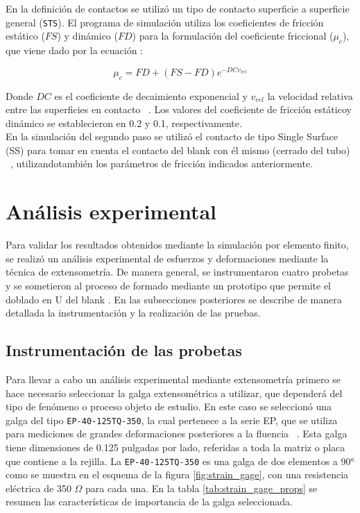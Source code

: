 En la definición de contactos se utilizó un tipo de contacto superficie a superficie
general (\texttt{STS}). El programa de simulación utiliza los coeficientes de fricción 
estático ($FS$) y dinámico ($FD$) para la formulación del coeficiente friccional ($\mu_c$),
que viene dado por la ecuación :

\begin{equation}
\mu_c = FD + (FS - FD) e^{-DCv_{rel}}
\label{eq:frictional_coeff}
\end{equation}

Donde $DC$ es el coeficiente de decaimiento exponencial y $v_{rel}$ la velocidad relativa
entre las superficies en contacto ~\cite{lsdyna-manual}. Los valores del coeficiente de 
fricción estáticoy dinámico se establecieron en 0.2 y 0.1, respectivamente. ~\cite{carvill1993} \\

En la simulación del segundo paso se utilizó el contacto de tipo Single Surface (SS) para 
tomar en cuenta el contacto del blank con él mismo (cerrado del tubo) ~\cite{lsdyna-manual}, 
utilizandotambién los parámetros de fricción indicados anteriormente.

\section{Análisis experimental}

Para validar los resultados obtenidos mediante la simulación por elemento finito, se realizó 
un análisis experimental de esfuerzos y deformaciones mediante la técnica de extensometría. 
De manera general, se instrumentaron cuatro probetas y se sometieron al proceso de formado 
mediante un prototipo que permite el doblado en U del blank . En las subsecciones posteriores se describe 
de manera detallada la instrumentación y la realización de las pruebas.

\subsection{Instrumentación de las probetas}

Para llevar a cabo un análisis experimental mediante extensometría primero se hace necesario 
seleccionar la galga extensométrica a utilizar, que dependerá del tipo de fenómeno o proceso 
objeto de estudio. En este caso se seleccionó una galga del tipo \texttt{EP-40-125TQ-350}, la 
cual pertenece a la serie EP, que se utiliza para mediciones de grandes deformaciones posteriores 
a la fluencia ~\cite{vishay-catalog}. Esta galga tiene dimensiones de 0.125 pulgadas por lado, referidas a toda la 
matriz o placa que contiene a la rejilla. La \texttt{EP-40-125TQ-350} es una galga de dos 
elementos a 90° como se muestra en el esquema de la figura \ref{fig:strain_gage}, con 
una resistencia eléctrica de 350 $\Omega$ para cada una. En la tabla \ref{tab:strain_gage_props} 
se resumen las características de importancia de la galga seleccionada.

